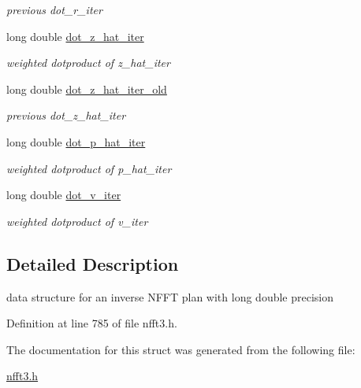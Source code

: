 \begin{DoxyCompactItemize}
\begin{DoxyCompactList}\small\item\em previous dot\-\_\-r\-\_\-iter \end{DoxyCompactList}\item 
\hypertarget{structsolverl__plan__complex_ae487ec619578f4f6d4876d7bc059f22a}{long double \hyperlink{structsolverl__plan__complex_ae487ec619578f4f6d4876d7bc059f22a}{dot\-\_\-z\-\_\-hat\-\_\-iter}}\label{structsolverl__plan__complex_ae487ec619578f4f6d4876d7bc059f22a}

\begin{DoxyCompactList}\small\item\em weighted dotproduct of z\-\_\-hat\-\_\-iter \end{DoxyCompactList}\item 
\hypertarget{structsolverl__plan__complex_af4efa34efc92f873c771df52d423f39e}{long double \hyperlink{structsolverl__plan__complex_af4efa34efc92f873c771df52d423f39e}{dot\-\_\-z\-\_\-hat\-\_\-iter\-\_\-old}}\label{structsolverl__plan__complex_af4efa34efc92f873c771df52d423f39e}

\begin{DoxyCompactList}\small\item\em previous dot\-\_\-z\-\_\-hat\-\_\-iter \end{DoxyCompactList}\item 
\hypertarget{structsolverl__plan__complex_a4941cd9e60935f7e39a0c86a52202c02}{long double \hyperlink{structsolverl__plan__complex_a4941cd9e60935f7e39a0c86a52202c02}{dot\-\_\-p\-\_\-hat\-\_\-iter}}\label{structsolverl__plan__complex_a4941cd9e60935f7e39a0c86a52202c02}

\begin{DoxyCompactList}\small\item\em weighted dotproduct of p\-\_\-hat\-\_\-iter \end{DoxyCompactList}\item 
\hypertarget{structsolverl__plan__complex_a14f62c3118e3c1c7a92dd9bf8877250c}{long double \hyperlink{structsolverl__plan__complex_a14f62c3118e3c1c7a92dd9bf8877250c}{dot\-\_\-v\-\_\-iter}}\label{structsolverl__plan__complex_a14f62c3118e3c1c7a92dd9bf8877250c}

\begin{DoxyCompactList}\small\item\em weighted dotproduct of v\-\_\-iter \end{DoxyCompactList}\end{DoxyCompactItemize}


\subsection{Detailed Description}
data structure for an inverse N\-F\-F\-T plan with long double precision 

Definition at line 785 of file nfft3.\-h.



The documentation for this struct was generated from the following file\-:\begin{DoxyCompactItemize}
\item 
\hyperlink{nfft3_8h}{nfft3.\-h}\end{DoxyCompactItemize}

